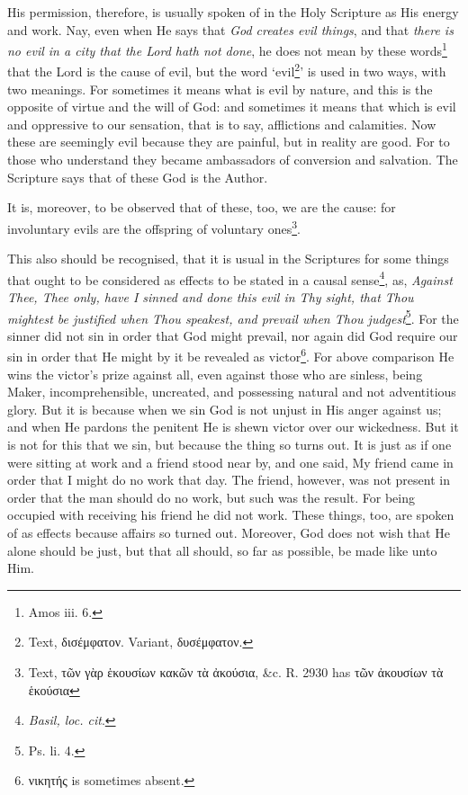 His permission, therefore, is usually spoken of in the Holy Scripture as His energy and work. Nay, even when He says that \emph{God creates evil things}, and that \emph{there is no evil in a city that the Lord hath not done}, he does not mean by these words\footnote{Amos iii. 6.} that the Lord is the cause of evil, but the word ‘evil\footnote{Text, \textgreek{δισέμφατον}. Variant, \textgreek{δυσέμφατον.}}’ is used in two ways, with two meanings. For sometimes it means what is evil by nature, and this is the opposite of virtue and the will of God: and sometimes it means that which is evil and oppressive to our sensation, that is to say, afflictions and calamities. Now these are seemingly evil because they are painful, but in reality are good. For to those who understand they became ambassadors of conversion and salvation. The Scripture says that of these God is the Author.

It is, moreover, to be observed that of these, too, we are the cause: for involuntary evils are the offspring of voluntary ones\footnote{Text, \textgreek{τῶν γὰρ ἑκουσίων κακῶν τὰ ἀκούσια}, \&c. R. 2930 has \textgreek{τῶν ἀκουσίων τὰ ἑκούσια}}.

This also should be recognised, that it is usual in the Scriptures for some things that ought to be considered as effects to be stated in a causal sense\footnote{\emph{Basil, loc. cit}.}, as, \emph{Against Thee, Thee only, have I sinned and done this evil in Thy sight, that Thou mightest be justified when Thou speakest, and prevail when Thou judgest}\footnote{Ps. li. 4.}. For the sinner did not sin in order that God might prevail, nor again did God require our sin in order that He might by it be revealed as victor\footnote{\textgreek{νικητής} is sometimes absent.}. For above comparison He wins the victor’s prize against all, even against those who are sinless, being Maker, incomprehensible, uncreated, and possessing natural and not adventitious glory. But it is because when we sin God is not unjust in His anger against us; and when He pardons the penitent He is shewn victor over our wickedness. But it is not for this that we sin, but because the thing so turns out. It is just as if one were sitting at work and a friend stood near by, and one said, My friend came in order that I might do no work that day. The friend, however, was not present in order that the man should do no work, but such was the result. For being occupied with receiving his friend he did not work. These things, too, are spoken of as effects because affairs so turned out. Moreover, God does not wish that He alone should be just, but that all should, so far as possible, be made like unto Him.

